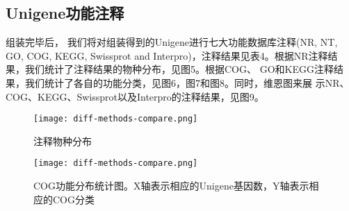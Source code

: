 \documentclass[10pt,oneside,a4paper]{article}	%
\begin{document}
\subsection{Unigene功能注释}
组装完毕后， 我们将对组装得到的Unigene进行七大功能数据库注释(NR, NT, GO, COG, KEGG, Swissprot and Interpro)，注释结果见表4。根据NR注释结
果，我们统计了注释结果的物种分布，见图5。根据COG、 GO和KEGG注释结果，我们统计了各自的功能分类，见图6，图7和图8。同时，维恩图来展
示NR、COG、KEGG、Swissprot以及Interpro的注释结果，见图9。
\par
\vspace{5 mm}

\begin{table}[H]
\centering
{} 
\end{table}
\par
\vspace{5 mm}

\begin{figure}[H]
\centering
\texttt{[image: diff-methods-compare.png]}
\par
\caption{注释物种分布}\label{fig:Species}\par
\end{figure}
\par
\vspace{5 mm}

\begin{figure}[H]
\centering
\texttt{[image: diff-methods-compare.png]}
\par
\caption{COG功能分布统计图。X轴表示相应的Unigene基因数，Y轴表示相应的COG分类}\label{fig:COG}\par
\end{figure}
\par
\vspace{5 mm}
\end{document}
